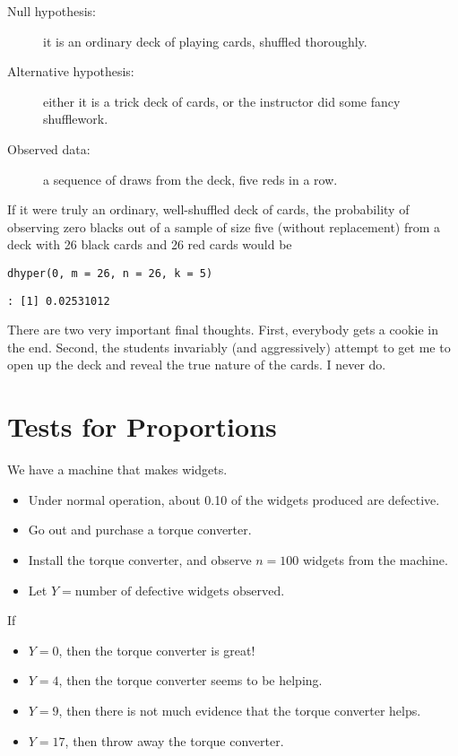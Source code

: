 \begin{description}
\item[{Null hypothesis:}] it is an ordinary deck of playing cards,
shuffled thoroughly.
\item[{Alternative hypothesis:}] either it is a trick deck of cards, or
the instructor did some fancy shufflework.
\item[{Observed data:}] a sequence of draws from the deck, five reds in a row.
\end{description}

If it were truly an ordinary, well-shuffled deck of cards, the
probability of observing zero blacks out of a sample of size five
(without replacement) from a deck with 26 black cards and 26 red cards
would be

\begin{verbatim}
dhyper(0, m = 26, n = 26, k = 5)
\end{verbatim}

\begin{verbatim}
: [1] 0.02531012
\end{verbatim}

There are two very important final thoughts. First, everybody gets a
cookie in the end. Second, the students invariably (and aggressively)
attempt to get me to open up the deck and reveal the true nature of
the cards. I never do.

\section{Tests for Proportions}
\label{sec-10-2}

\label{exa-widget-machine}
We have a machine that makes widgets. 
\begin{itemize}
\item Under normal operation, about 0.10 of the widgets produced are
defective.
\item Go out and purchase a torque converter.
\item Install the torque converter, and observe \(n=100\) widgets from the
machine.
\item Let \(Y=\mbox{number of defective widgets observed}\).
\end{itemize}

If
\begin{itemize}
\item \(Y=0\), then the torque converter is great!
\item \(Y=4\), then the torque converter seems to be helping.
\item \(Y=9\), then there is not much evidence that the torque converter helps.
\item \(Y=17\), then throw away the torque converter.
\end{itemize}

